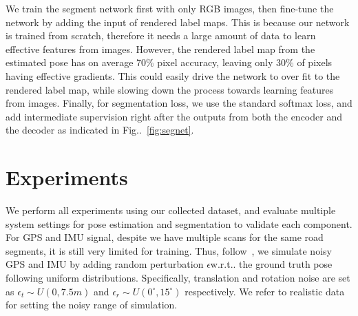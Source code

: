 \documentclass[10pt,twocolumn,letterpaper]{article}
\makeatletter
\newcommand{\figref}[1]{Fig\onedot~\ref{#1}}
\DeclareRobustCommand\onedot{\futurelet\@let@token\@onedot}
\def\onedot{\ifx\@let@token.\else.\null\fi\xspace}
\def\wrt{w.r.t\onedot}
\makeatother
\begin{document}
We train the segment network first with only RGB images, then fine-tune the network by adding the input of rendered label maps. This is because our network is trained from scratch, therefore it needs a large amount of data to learn effective features from images. However, the rendered label map from the estimated pose has on average 70$\%$ pixel accuracy, leaving only 30$\%$ of pixels having effective gradients. This could easily drive the network to over fit to the rendered label map, while slowing down the process towards learning features from images. Finally, for segmentation loss, we use the standard softmax loss, and add intermediate supervision right after the outputs from both the encoder and the decoder as indicated in \figref{fig:segnet}. 


\vspace{-1.0\baselineskip}\section{Experiments}\vspace{-0.4\baselineskip}\label{sec:experiments}
We perform all experiments using our collected dataset, and evaluate multiple system settings for pose estimation and segmentation to validate each component.
For GPS and IMU signal, despite we have multiple scans for the same road segments, it is still very limited for training. Thus, follow~\cite{vishal2015accurate}, we simulate noisy GPS and IMU by adding random perturbation $\epsilon$\wrt the ground truth pose following uniform distributions. 
Specifically, translation and rotation noise are set as $\epsilon_t \sim U(0, 7.5m)$ and $\epsilon_r \sim U(0^{\circ}, 15^{\circ})$ respectively. 
We refer to realistic data~\cite{lee2015gps} for setting the noisy range of simulation.
\end{document}
